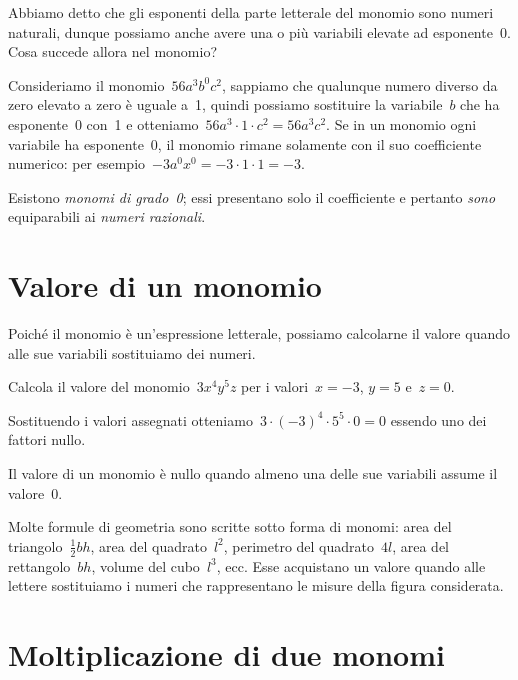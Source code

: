 Abbiamo detto che gli esponenti della parte letterale del monomio sono
numeri naturali, dunque possiamo anche avere una o più variabili
elevate ad esponente~0. Cosa succede allora nel monomio?

Consideriamo il monomio~$56a^{3}b^{0}c^{2}$, sappiamo che qualunque
numero diverso da zero elevato a zero è uguale a~1, quindi possiamo
sostituire la variabile~$b$ che ha esponente~0 con~1 e
otteniamo~$56a^{3}\cdot 1\cdot c^{2}=56a^{3}c^{2}$. Se in un monomio ogni
variabile ha esponente~0, il monomio rimane solamente con il suo
coefficiente numerico: per esempio~$-3a^{0}x^{0}=-3\cdot 1\cdot 1=-3$.

\osservazione Esistono \emph{monomi di grado~0}; essi presentano solo il
coefficiente e pertanto \emph{sono} equiparabili ai \emph{numeri razionali}.

\section{Valore di un monomio}

Poiché il monomio è un'espressione letterale,
possiamo calcolarne il valore quando alle sue variabili sostituiamo dei numeri.

\begin{exrig}
 \begin{esempio}
 Calcola il valore del monomio~$3x^{4}y^{5}z$ per i valori~$x=-3$, $y=5$ e~$z=0$.

Sostituendo i valori assegnati otteniamo~$3\cdot (-3)^{4}\cdot 5^{5}\cdot 0=0$ essendo uno dei fattori nullo.
 \end{esempio}
\end{exrig}

\osservazione Il valore di un monomio è nullo quando almeno una delle sue variabili
assume il valore~0.

Molte formule di geometria sono scritte sotto forma di monomi: area del
triangolo~$\frac{1}{2}bh$, area del quadrato~$l^{2}$,
perimetro del quadrato~$4l$, area del rettangolo~$bh$, volume del cubo~$l^{3}$, ecc.
Esse acquistano un valore quando alle lettere sostituiamo
i numeri che rappresentano le misure della figura considerata.

\ovalbox{\risolvii \ref{ese:9.4}, \ref{ese:9.5}, \ref{ese:9.6}, \ref{ese:9.7}, \ref{ese:9.8}, \ref{ese:9.9}, \ref{ese:9.10}, \ref{ese:9.11}, \ref{ese:9.12}}

\section{Moltiplicazione di due monomi}

